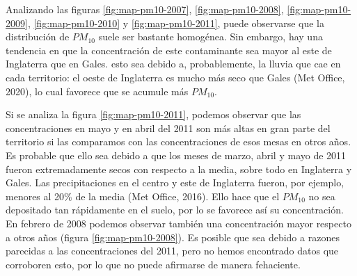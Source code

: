\documentclass[12pt]{article}
\begin{document}
Analizando las figuras \ref{fig:map-pm10-2007}, \ref{fig:map-pm10-2008}, \ref{fig:map-pm10-2009}, \ref{fig:map-pm10-2010} y \ref{fig:map-pm10-2011}, puede observarse que la distribución de $PM_{10}$ suele ser bastante homogénea. Sin embargo, hay una tendencia en que la concentración de este contaminante sea mayor al este de Inglaterra que en Gales. esto sea debido a, probablemente, la lluvia que cae en cada territorio: el oeste de Inglaterra es mucho más seco que Gales (Met Office, 2020), lo cual favorece que se acumule más $PM_{10}$.

Si se analiza la figura \ref{fig:map-pm10-2011}, podemos observar que las concentraciones en mayo y en abril del 2011 son más altas en gran parte del territorio si las comparamos con las concentraciones de esos mesas en otros años. Es probable que ello sea debido a que los meses de marzo, abril y mayo de 2011 fueron extremadamente secos con respecto a la media, sobre todo en Inglaterra y Gales. Las precipitaciones en el centro y este de Inglaterra fueron, por ejemplo, menores al 20\% de la media (Met Office, 2016). Ello hace que el $PM_{10}$ no sea depositado tan rápidamente en el suelo, por lo se favorece así su concentración. En febrero de 2008 podemos observar también una concentración mayor respecto a otros años (figura \ref{fig:map-pm10-2008}). Es posible que sea debido a razones parecidas a las concentraciones del 2011, pero no hemos encontrado datos que corroboren esto, por lo que no puede afirmarse de manera fehaciente.
\end{document}
